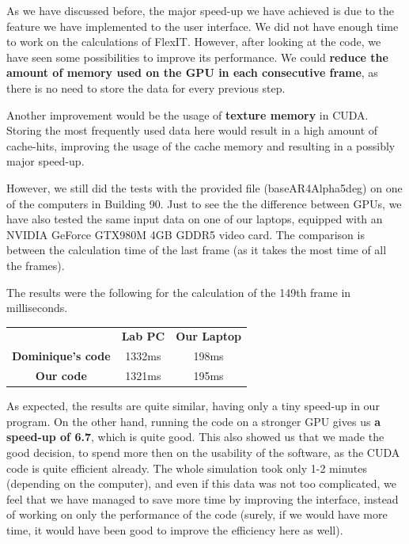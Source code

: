 \documentclass[a4paper, 11pt, article]{report}
\begin{document}
As we have discussed before, the major speed-up we have achieved is due to the feature we have implemented to the user interface. We did not have enough time to work on the calculations of FlexIT. However, after looking at the code, we have seen some possibilities to improve its performance. We could \textbf{reduce the amount of memory used on the GPU in each consecutive frame}, as there is no need to store the data for every previous step.

Another improvement would be the usage of \textbf{texture memory} in CUDA. Storing the most frequently used data here would result in a high amount of cache-hits, improving the usage of the cache memory and resulting in a possibly major speed-up.

However, we still did the tests with the provided file (baseAR4Alpha5deg) on one of the computers in Building 90. Just to see the the difference between GPUs, we have also tested the same input data on one of our laptops, equipped with an NVIDIA GeForce GTX980M 4GB GDDR5 video card. The comparison is between the calculation time of the last frame (as it takes the most time of all the frames). 

The results were the following for the calculation of the 149th frame in milliseconds.

\begin{center}
\begin{tabular}{ c c c }
 & \textbf{Lab PC} & \textbf{Our Laptop} \\
 \textbf{Dominique's code} & 1332ms & 198ms \\ 
 \textbf{Our code} & 1321ms & 195ms   
\end{tabular}
\end{center}

As expected, the results are quite similar, having only a tiny speed-up in our program. On the other hand, running the code on a stronger GPU gives us \textbf{a speed-up of 6.7}, which is quite good. This also showed us that we made the good decision, to spend more then on the usability of the software, as the CUDA code is quite efficient already. The whole simulation took only 1-2 minutes (depending on the computer), and even if this data was not too complicated, we feel that we have managed to save more time by improving the interface, instead of working on only the performance of the code (surely, if we would have more time, it would have been good to improve the efficiency here as well).

\end{document}
